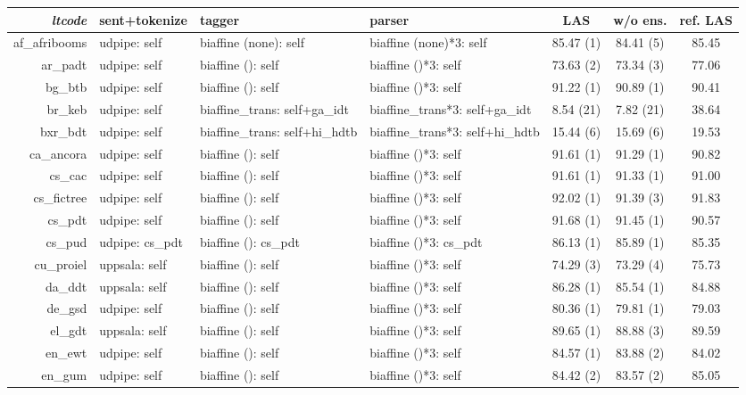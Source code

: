 \documentclass[11pt,a4paper]{article}
\begin{document}
\begin{table*}[t]
	\scriptsize
	\centering
	\setlength{\tabcolsep}{4pt}
	\begin{tabular}{rlllccc}
		\textit{ltcode} & sent+tokenize & tagger & parser & LAS &  w/o ens. & ref. LAS  \\
		\hline
		af\_afribooms & udpipe: self & biaffine (none): self & biaffine (none)*3: self & 85.47 (1) & 84.41 (5) & 85.45 \\
		ar\_padt & udpipe: self & biaffine (): self & biaffine ()*3: self & 73.63 (2) & 73.34 (3) & 77.06 \\
		bg\_btb & udpipe: self & biaffine (): self & biaffine ()*3: self & 91.22 (1) & 90.89 (1) & 90.41 \\
		br\_keb & udpipe: self & biaffine\_trans: self+ga\_idt & biaffine\_trans*3: self+ga\_idt & 8.54 (21)& 7.82 (21)& 38.64 \\
		bxr\_bdt & udpipe: self & biaffine\_trans: self+hi\_hdtb & biaffine\_trans*3: self+hi\_hdtb & 15.44 (6) & 15.69 (6)& 19.53  \\
		ca\_ancora & udpipe: self & biaffine (): self & biaffine ()*3: self & 91.61 (1) & 91.29 (1) & 90.82  \\
		cs\_cac & udpipe: self & biaffine (): self & biaffine ()*3: self & 91.61 (1) & 91.33 (1)& 91.00 \\
		cs\_fictree & udpipe: self & biaffine (): self & biaffine ()*3: self & 92.02 (1) & 91.39 (3) & 91.83 \\
		cs\_pdt & udpipe: self & biaffine (): self & biaffine ()*3: self & 91.68 (1) & 91.45 (1) & 90.57 \\
		cs\_pud & udpipe: cs\_pdt & biaffine (): cs\_pdt & biaffine ()*3: cs\_pdt & 86.13 (1) & 85.89 (1) & 85.35 \\
		cu\_proiel & uppsala: self & biaffine (): self & biaffine ()*3: self & 74.29 (3) & 73.29 (4) & 75.73  \\
		da\_ddt & uppsala: self & biaffine (): self & biaffine ()*3: self & 86.28 (1) & 85.54 (1) & 84.88 \\
		de\_gsd & udpipe: self & biaffine (): self & biaffine ()*3: self & 80.36 (1) & 79.81 (1) & 79.03 \\
		el\_gdt & uppsala: self & biaffine (): self & biaffine ()*3: self & 89.65 (1) & 88.88 (3) & 89.59 \\
		en\_ewt & udpipe: self & biaffine (): self & biaffine ()*3: self & 84.57 (1) & 83.88 (2) & 84.02  \\
		en\_gum & udpipe: self & biaffine (): self & biaffine ()*3: self & 84.42 (2) & 83.57 (2) & 85.05  \\

\end{tabular}
\end{table*}
\end{document}
